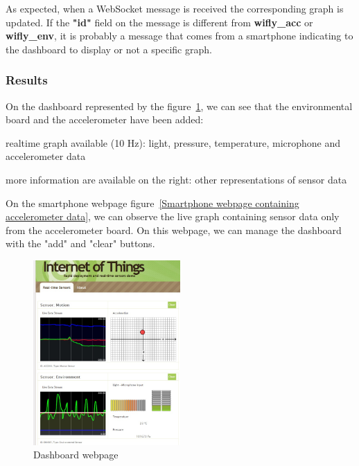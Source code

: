 \documentclass[pdftex,10pt,a4paper]{report}
\newenvironment{packed_item}{
\begin{itemize}
  \setlength{\itemsep}{1pt}
  \setlength{\parskip}{0pt}
  \setlength{\parsep}{0pt}
}{\end{itemize}}
\begin{document}
As expected, when a WebSocket message is received the corresponding graph is updated. If the \textbf{"id"} field on the message is different from \textbf{wifly\_acc} or \textbf{wifly\_env}, it is probably a message that comes from a smartphone indicating to the dashboard to display or not a specific graph. 

\subsubsection{Results}

On the dashboard represented by the figure~\ref{Dashboard webpage}, we can see that the environmental board and the accelerometer have been added:
\begin{packed_item}
	\item realtime graph available (10 Hz): light, pressure, temperature, microphone and accelerometer data
	\item more information are available on the right: other representations of sensor data
\end{packed_item}

On the smartphone webpage figure~\ref{Smartphone webpage containing accelerometer data}, we can observe the live graph containing sensor data only from the accelerometer board. On this webpage, we can manage the dashboard with the "add" and "clear" buttons.

\begin{figure}[h!]
		\centering
		\includegraphics[width=0.5\textwidth]{./dashboard_acc_env.jpg}
		\caption{Dashboard webpage}
		\label{Dashboard webpage}
\end{figure}
\end{document}
